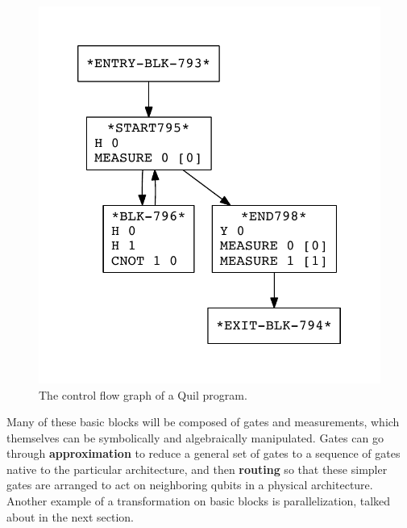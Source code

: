 \documentclass[conference]{IEEEtran}
\newcommand{\defn}[1]{\textbf{#1}}
\begin{document}
\begin{figure}[ht]
    \centering
    \includegraphics[scale=0.5]{loop-serial.pdf}
    \caption{The control flow graph of a Quil program.}
    \label{fig:cfg}
\end{figure}

Many of these basic blocks will be composed of gates and measurements, which themselves can be symbolically and algebraically manipulated. Gates can go through \defn{approximation} to reduce a general set of gates to a sequence of gates native to the particular architecture, and then \defn{routing} so that these simpler gates are arranged to act on neighboring qubits in a physical architecture. Another example of a transformation on basic blocks is parallelization, talked about in the next section.
\end{document}
